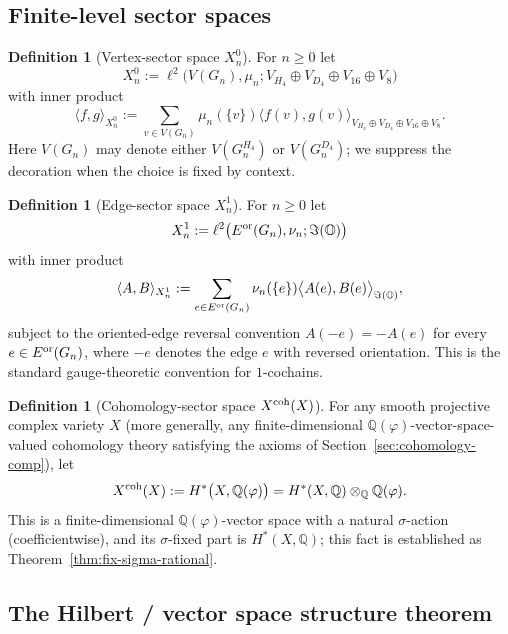 \documentclass[11pt, a4paper]{amsart}
\theoremstyle{definition}
\newtheorem{definition}[theorem]{Definition}
\newcommand{\Q}{\mathbb{Q}}
\newcommand{\OO}{\mathbb{O}}
\newcommand{\pphi}{\varphi}
\newcommand{\co}{{\rm coh}}
\begin{document}
\subsection{Finite-level sector spaces}
\label{subsec:sector-spaces}

\begin{definition}[Vertex-sector space $X_n^0$]
\label{def:X-n-0}
For $n \geq 0$ let
\[
  X_n^0 := \ell^2\big(V(G_n), \mu_n; V_{H_4} \oplus V_{D_4}
    \oplus V_{16} \oplus V_8\big)
\]
with inner product
\[
  \langle f, g\rangle_{X_n^0}
  := \sum_{v \in V(G_n)} \mu_n(\{v\})
    \big\langle f(v), g(v) \big\rangle_{V_{H_4} \oplus V_{D_4}
    \oplus V_{16} \oplus V_8}.
\]
Here $V(G_n)$ may denote either $V(G_n^{H_4})$ or $V(G_n^{D_4})$;
we suppress the decoration when the choice is fixed by context.
\end{definition}

\begin{definition}[Edge-sector space $X_n^1$]
\label{def:X-n-1}
For $n \geq 0$ let
\[
  X_n^1 := \ell^2\big(E^{\rm or}(G_n), \nu_n; \Im(\OO)\big)
\]
with inner product
\[
  \langle A, B\rangle_{X_n^1}
  := \sum_{e \in E^{\rm or}(G_n)} \nu_n(\{e\})
    \big\langle A(e), B(e) \big\rangle_{\Im(\OO)},
\]
subject to the oriented-edge reversal convention $A(-e) = -A(e)$
for every $e \in E^{\rm or}(G_n)$, where $-e$ denotes the edge $e$
with reversed orientation. This is the standard gauge-theoretic
convention for $1$-cochains.
\end{definition}

\begin{definition}[Cohomology-sector space $X^{\co}(X)$]
\label{def:X-coh}
For any smooth projective complex variety $X$ (more generally, any
finite-dimensional $\Q(\pphi)$-vector-space-valued cohomology
theory satisfying the axioms of Section~\ref{sec:cohomology-comp}),
let
\[
  X^{\co}(X) := H^*\big(X, \Q(\pphi)\big)
  = H^*(X, \Q) \otimes_{\Q} \Q(\pphi).
\]
This is a finite-dimensional $\Q(\pphi)$-vector space with a
natural $\sigma$-action (coefficientwise), and its $\sigma$-fixed
part is $H^*(X, \Q)$; this fact is established as
Theorem~\ref{thm:fix-sigma-rational}.
\end{definition}

\subsection{The Hilbert / vector space structure theorem}
\label{subsec:hilbert-thm}
\end{document}
